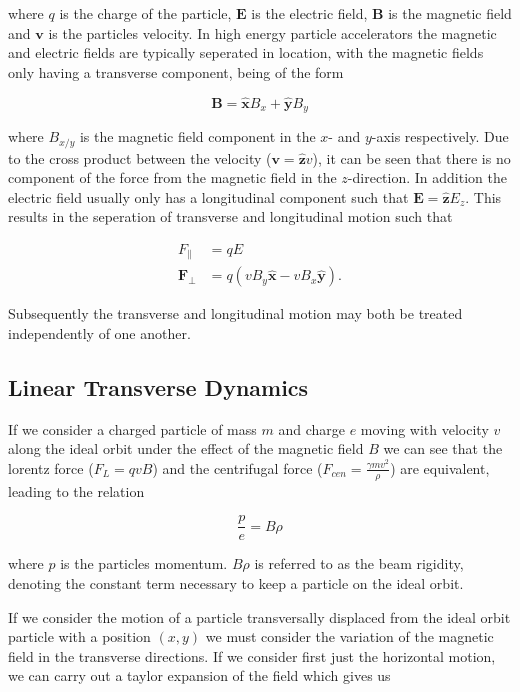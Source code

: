 where $q$ is the charge of the particle, $\mathbf{E}$ is the electric field, $\mathbf{B}$ is the magnetic field and $\mathbf{v}$ is the particles velocity. In high energy particle accelerators the magnetic and electric fields are typically seperated in location, with the magnetic fields only having a transverse component, being of the form

\begin{equation}
\mathbf{B} = \mathbf{\hat{x}} B_{x} + \mathbf{\hat{y}} B_{y}
\end{equation}

where $B_{x/y}$ is the magnetic field component in the $x$- and $y$-axis respectively. Due to the cross product between the velocity ($\mathbf{v} = \mathbf{\hat{z}} v$), it can be seen that there is no component of the force from the magnetic field in the $z$-direction. In addition the electric field usually only has a longitudinal component such that $\mathbf{E} = \mathbf{\hat{z}} E_{z}$. This results in the seperation of transverse and longitudinal motion such that

\begin{align}
F_{\parallel} &= qE \\
\mathbf{F_{\perp}} &= q \left( vB_{y} \mathbf{\hat{x}} - vB_{x} \mathbf{\hat{y}} \right).
\end{align}

Subsequently the transverse and longitudinal motion may both be treated independently of one another.

\subsection{Linear Transverse Dynamics}

If we consider a charged particle of mass $m$ and charge $e$ moving with velocity $v$ along the ideal orbit under the effect of the magnetic field $B$ we can see that the lorentz force ($F_{L} = qvB$) and the centrifugal force ($F_{cen} = \frac{\gamma m v^{2}}{\rho}$) are equivalent, leading to the relation

\begin{equation}
\frac{p}{e} = B \rho
\end{equation}

where $p$ is the particles momentum. $B \rho$ is referred to as the beam rigidity, denoting the constant term necessary to keep a particle on the ideal orbit. 

If we consider the motion of a particle transversally displaced from the ideal orbit particle with a position $(x, y)$ we must consider the variation of the magnetic field in the transverse directions. If we consider first just the horizontal motion, we can carry out a taylor expansion of the field which gives us

